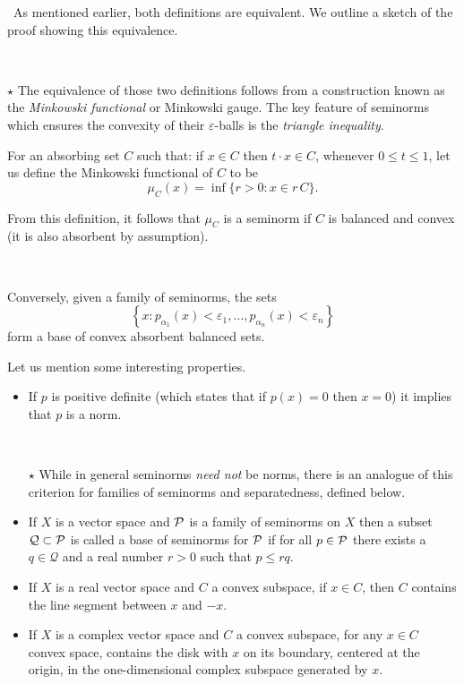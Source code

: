 \,
 As mentioned earlier, both definitions are equivalent.  We outline a sketch of the proof showing this equivalence. 

\, 

$\star$ The equivalence of those two definitions follows from a construction known as the \emph{Minkowski functional} or Minkowski gauge. The key feature of seminorms which ensures the convexity of their $\varepsilon$-balls is the {\it triangle inequality}.

\vspace{3pt}

For an absorbing set $C$ such that: if $x\in C$ then $ t\cdot x\in C$, whenever $ 0\leq t\leq 1$, let us define the Minkowski functional of $C$ to be \[\mu _{C}(x)=\inf\{r>0 : x \in r\, C\}.\]

\vspace{3pt}

From this definition, it follows that $\mu _{C}$ is a seminorm if $C$ is balanced and convex (it is also absorbent by assumption). 

\, 

Conversely, given a family of seminorms, the sets
\[\left\{x:p_{\alpha _{1}}(x)<\varepsilon _{1},\ldots ,p_{\alpha _{n}}(x)<\varepsilon _{n}\right\}\] form a base of convex absorbent balanced sets.


\vspace{5pt}
Let us mention some interesting properties.
\begin{itemize}
\item If $p$ is positive definite (which states that if $p(x)=0$ then 
 $x=0$) it implies that $p$ is a norm. 

\,

$\star$ While in general seminorms {\it need not} be norms, there is an analogue of this criterion for families of seminorms and separatedness, defined below.\\

\item If $X$ is a vector space and $\mathcal{P}$ is a family of seminorms on $X$ then a subset $\mathcal{Q} \subset \mathcal{P}$ is called a base of seminorms for $\mathcal{P}$ if for all $p\in \mathcal{P}$ there exists a $q\in \mathcal{Q} $ and a real number $r>0$ such that $p\leq rq$.\\

\item If $X$ is a real vector space and $C$ a convex subspace, if $x\in C$, then $C$ contains the line segment between $x$ and $-x$.\\
 
\item If $X$ is a complex vector space and $C$ a convex subspace,  for any $ x\in C$ convex space, contains the disk with $x$ on its boundary, centered at the origin, in the one-dimensional complex subspace generated by $x$.
\end{itemize}


